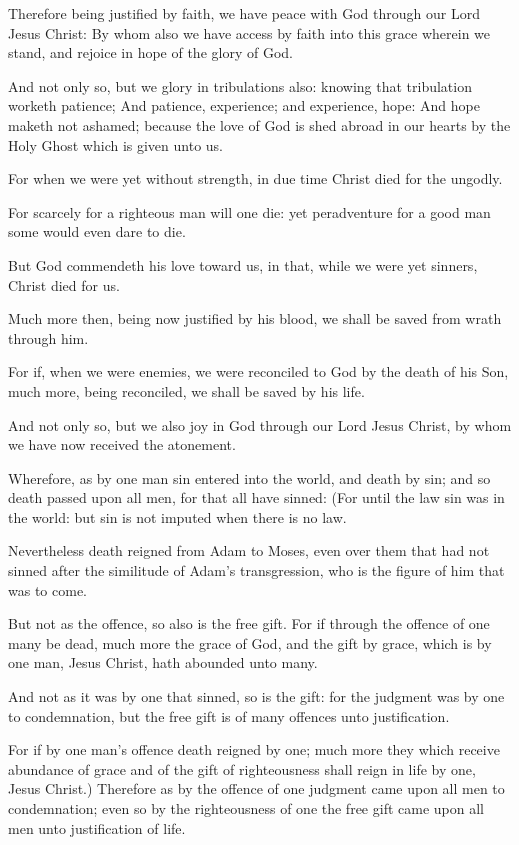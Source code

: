 \Chapter
\Verse Therefore being justified by faith, we have peace with God through our Lord Jesus Christ: \Verse By whom also we have access by faith into this grace wherein we stand, and rejoice in hope of the glory of God.

\Verse And not only so, but we glory in tribulations also: knowing that tribulation worketh patience; \Verse And patience, experience; and experience, hope: \Verse And hope maketh not ashamed; because the love of God is shed abroad in our hearts by the Holy Ghost which is given unto us.

\Verse For when we were yet without strength, in due time Christ died for the ungodly.

\Verse For scarcely for a righteous man will one die: yet peradventure for a good man some would even dare to die.

\Verse But God commendeth his love toward us, in that, while we were yet sinners, Christ died for us.

\Verse Much more then, being now justified by his blood, we shall be saved from wrath through him.

\Verse For if, when we were enemies, we were reconciled to God by the death of his Son, much more, being reconciled, we shall be saved by his life.

\Verse And not only so, but we also joy in God through our Lord Jesus Christ, by whom we have now received the atonement.

\Verse Wherefore, as by one man sin entered into the world, and death by sin; and so death passed upon all men, for that all have sinned: \Verse (For until the law sin was in the world: but sin is not imputed when there is no law.

\Verse Nevertheless death reigned from Adam to Moses, even over them that had not sinned after the similitude of Adam's transgression, who is the figure of him that was to come.

\Verse But not as the offence, so also is the free gift. For if through the offence of one many be dead, much more the grace of God, and the gift by grace, which is by one man, Jesus Christ, hath abounded unto many.

\Verse And not as it was by one that sinned, so is the gift: for the judgment was by one to condemnation, but the free gift is of many offences unto justification.

\Verse For if by one man's offence death reigned by one; much more they which receive abundance of grace and of the gift of righteousness shall reign in life by one, Jesus Christ.)  \Verse Therefore as by the offence of one judgment came upon all men to condemnation; even so by the righteousness of one the free gift came upon all men unto justification of life.

